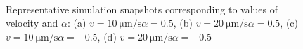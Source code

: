 \documentclass[../../master_thesis_np.tex]{subfiles}
\begin{document}
\begin{figure}[htp]
			\\
			
			\caption{Representative simulation snapshots corresponding to values of velocity and $\alpha$: (a) $v = \SI{10}{\um \per \second} \alpha = 0.5$, (b) $v = \SI{20}{\um \per \second} \alpha = 0.5$, (c) $v = \SI{10}{\um \per \second} \alpha = -0.5$, (d) $v = \SI{20}{\um \per \second} \alpha = -0.5$}
			\label{fig:lj_velocity_situa}
		\end{figure}
		
\end{document}
